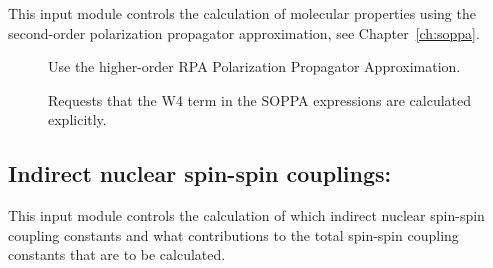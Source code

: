 This input module controls the calculation of molecular properties
using the second-order polarization propagator approximation, see
Chapter~\ref{ch:soppa}. 

\begin{description}
\item[] Use the higher-order RPA Polarization Propagator
  Approximation.

\item[] Requests that the W4 term in the SOPPA expressions
  are calculated explicitly.
\end{description}

\subsection{Indirect nuclear spin-spin couplings:
}\label{sec:spin-s}

This input module controls the calculation of which indirect nuclear
spin-spin coupling constants and what contributions to the total
spin-spin coupling constants that are to be calculated.

